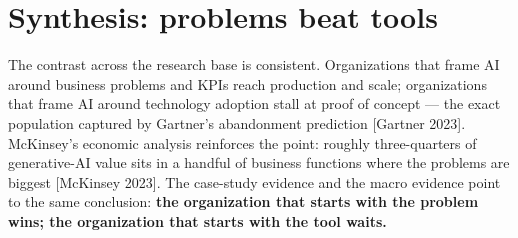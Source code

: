 \section{Synthesis: problems beat tools}

The contrast across the research base is consistent. Organizations that frame
AI around business problems and KPIs reach production and scale; organizations
that frame AI around technology adoption stall at proof of concept — the exact
population captured by Gartner's abandonment prediction [Gartner 2023].
McKinsey's economic analysis reinforces the point: roughly three-quarters of
generative-AI value sits in a handful of business functions where the problems
are biggest [McKinsey 2023]. The case-study evidence and the macro evidence
point to the same conclusion: \textbf{the organization that starts with the
problem wins; the organization that starts with the tool waits.}
